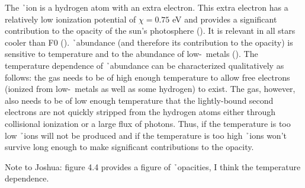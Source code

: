 
The \h\ ion is a hydrogen atom with an extra electron.  This extra electron
has a relatively low ionization potential of $\chi = 0.75$ eV and
provides a significant contribution to the opacity of the sun's
photosphere (\citealt{ryden2010foundations}).  It is relevant in all
stars cooler than F0 (\citealt{carroll2007introduction}). \h\
abundance (and therefore its contribution to the opacity) is sensitive 
to temperature and to the abundance of low-\chii\ metals
(\citealt{hansen1994stellar}).  The temperature dependence of \h\
abundance can be characterized qualitatively as follows: the gas needs
to be of high enough temperature to allow free electrons (ionized from
low-\chii\ metals as well as some hydrogen) to exist.  The gas,
however, also needs to be of low enough temperature that the
lightly-bound second electrons are not quickly stripped from the
hydrogen atoms either through collisional ionization or a large flux
of photons.  Thus, if the temperature is too low \h\ ions will not be
produced and if the temperature is too high \h\ ions won't survive
long enough to make significant contributions to the opacity.


Note to Joshua:  \cite{hansen1994stellar} figure 4.4 provides a figure
of \h\ opacities, I think the temperature dependence.
